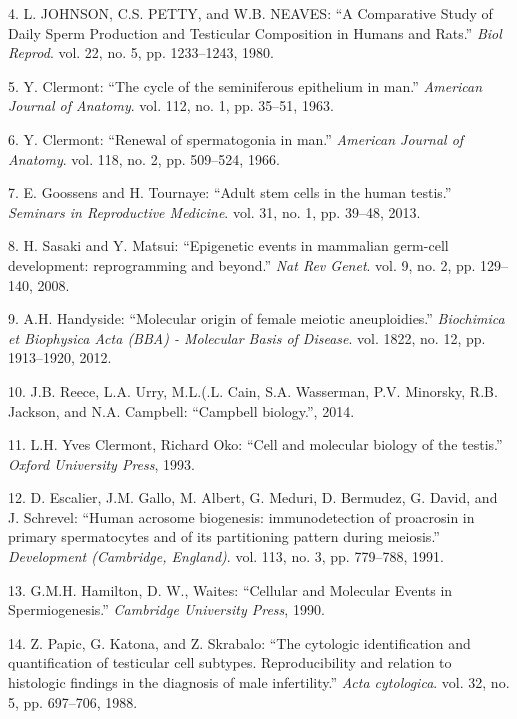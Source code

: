 \documentclass[12pt,a4paper,twoside]{ugathesis}
\theoremstyle{definition}
\theoremstyle{definition}
\theoremstyle{definition}
\theoremstyle{remark}
\begin{document}
\hypertarget{ref-Johnson1980}{}
4. L. JOHNSON, C.S. PETTY, and W.B. NEAVES: ``A Comparative Study of
Daily Sperm Production and Testicular Composition in Humans and Rats.''
\emph{Biol Reprod}. vol. 22, no. 5, pp. 1233--1243, 1980.

\hypertarget{ref-Clermont1963}{}
5. Y. Clermont: ``The cycle of the seminiferous epithelium in man.''
\emph{American Journal of Anatomy}. vol. 112, no. 1, pp. 35--51, 1963.

\hypertarget{ref-Clermont1966}{}
6. Y. Clermont: ``Renewal of spermatogonia in man.'' \emph{American
Journal of Anatomy}. vol. 118, no. 2, pp. 509--524, 1966.

\hypertarget{ref-Goossens2013}{}
7. E. Goossens and H. Tournaye: ``Adult stem cells in the human
testis.'' \emph{Seminars in Reproductive Medicine}. vol. 31, no. 1, pp.
39--48, 2013.

\hypertarget{ref-Sasaki2008}{}
8. H. Sasaki and Y. Matsui: ``Epigenetic events in mammalian germ-cell
development: reprogramming and beyond.'' \emph{Nat Rev Genet}. vol. 9,
no. 2, pp. 129--140, 2008.

\hypertarget{ref-Handyside2012}{}
9. A.H. Handyside: ``Molecular origin of female meiotic aneuploidies.''
\emph{Biochimica et Biophysica Acta (BBA) - Molecular Basis of Disease}.
vol. 1822, no. 12, pp. 1913--1920, 2012.

\hypertarget{ref-Reece2014}{}
10. J.B. Reece, L.A. Urry, M.L.(.L. Cain, S.A. Wasserman, P.V. Minorsky,
R.B. Jackson, and N.A. Campbell: ``Campbell biology.'', 2014.

\hypertarget{ref-YvesClermontRichardOko1993}{}
11. L.H. Yves Clermont, Richard Oko: ``Cell and molecular biology of the
testis.'' \emph{Oxford University Press}, 1993.

\hypertarget{ref-Escalier1991}{}
12. D. Escalier, J.M. Gallo, M. Albert, G. Meduri, D. Bermudez, G.
David, and J. Schrevel: ``Human acrosome biogenesis: immunodetection of
proacrosin in primary spermatocytes and of its partitioning pattern
during meiosis.'' \emph{Development (Cambridge, England)}. vol. 113, no.
3, pp. 779--788, 1991.

\hypertarget{ref-Hamilton1987}{}
13. G.M.H. Hamilton, D. W., Waites: ``Cellular and Molecular Events in
Spermiogenesis.'' \emph{Cambridge University Press}, 1990.

\hypertarget{ref-Papic}{}
14. Z. Papic, G. Katona, and Z. Skrabalo: ``The cytologic identification
and quantification of testicular cell subtypes. Reproducibility and
relation to histologic findings in the diagnosis of male infertility.''
\emph{Acta cytologica}. vol. 32, no. 5, pp. 697--706, 1988.
\end{document}
